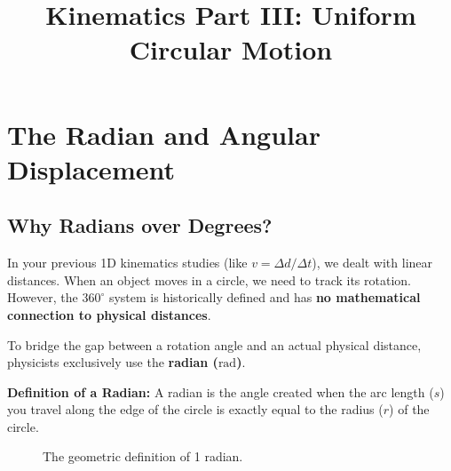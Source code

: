 \documentclass{article}
\begin{document}
\title{Kinematics Part III: Uniform Circular Motion}
\author{}
\date{}
\maketitle


\section{The Radian and Angular Displacement}

\subsection{Why Radians over Degrees?}
In your previous 1D kinematics studies (like $v = \Delta d / \Delta t$), we dealt with linear distances. When an object moves in a circle, we need to track its rotation. However, the $360^\circ$ system is historically defined and has \textbf{no mathematical connection to physical distances}. 

To bridge the gap between a rotation angle and an actual physical distance, physicists exclusively use the \textbf{radian ($\text{rad}$)}. 

\textbf{Definition of a Radian:} A radian is the angle created when the arc length ($s$) you travel along the edge of the circle is exactly equal to the radius ($r$) of the circle.

\begin{figure}[h]
    \centering
    \caption{The geometric definition of 1 radian.}
\end{figure}
\end{document}
